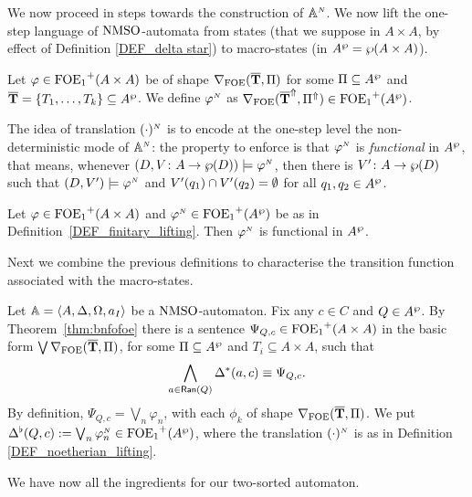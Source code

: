 We now proceed in steps towards the construction of $\mathbb{A}^{{\scriptscriptstyle N}}$. We now lift the one-step language of $\mathrm{NMSO}$-automata from states (that we suppose in $A \times A$, by effect of Definition \ref{DEF_delta star}) to macro-states (in $A^{\wp} = \wp (A \times A)$).

\begin{definition}\label{DEF_finitary_lifting}
Let $\varphi \in {\ensuremath{\mathrm{FOE}_1}}^+(A \times A)$ be of shape $\nabla_{\mathrm{FOE}}(\overline{{\mathbf{T}}},\Pi)$ for some $\Pi \subseteq A^{\wp}$ and $\overline{{\mathbf{T}}} = \{T_1,\dots,T_k\} \subseteq A^{\wp}$. We define $\varphi^{{\scriptscriptstyle N}}$ as $\nabla_{\mathrm{FOE}}(\overline{{\mathbf{T}}}^{\Uparrow},\Pi^{\Uparrow}) \in {\ensuremath{\mathrm{FOE}_1}}^+(A^{\wp} )$.
\end{definition}

The idea of translation $(\cdot)^{{\scriptscriptstyle N}}$ is to encode at the one-step level the non-deterministic mode of $\mathbb{A}^{{\scriptscriptstyle N}}$: the property to enforce is that $\varphi^{{\scriptscriptstyle N}}$ is \emph{functional} in $A^{\wp}$, that means, whenever $(D,V \colon A \to \wp(D)) \models \varphi^{{\scriptscriptstyle N}}$, then there is $V'  \colon A \to \wp(D)$ such that $(D, V') \models \varphi^{{\scriptscriptstyle N}}$ and  $ V'(q_1)\cap V'(q_2) = \emptyset$ for all $q_1,q_2 \in A^{\wp}$. 

\begin{lemma}\label{LEM_cont}
Let $\varphi \in {\ensuremath{\mathrm{FOE}_1}}^+(A \times A)$ and $\varphi^{{\scriptscriptstyle N}}\in {\ensuremath{\mathrm{FOE}_1}}^+(A^{\wp} )$ be as in Definition~\ref{DEF_finitary_lifting}. Then $\varphi^{{\scriptscriptstyle N}}$ is functional in $A^{\wp}$.
 \end{lemma}

 Next we combine the previous definitions to characterise the transition function associated with the macro-states.
\begin{definition}\label{PROP_DeltaPowerset}
Let $\mathbb{A} = \langle{A,\Delta,\Omega,a_I}\rangle$ be a $\mathrm{NMSO}$-automaton. Fix any $c \in C$ and $Q \in A^{\wp}$. By Theorem~\ref{thm:bnfofoe} there is a sentence $\Psi_{Q,c} \in {\ensuremath{\mathrm{FOE}_1}}^+(A\times A)$ in the basic form $\bigvee \nabla_{\mathrm{FOE}}(\overline{{\mathbf{T}}},\Pi)$, for some $\Pi \subseteq A^{\wp}$ and $T_i \subseteq A \times A$, such that
$$\bigwedge_{a \in \mathsf{Ran}(Q)} \Delta^{*}(a,c) \equiv \Psi_{Q,c}.$$
By definition, $\Psi_{Q,c} = \bigvee_{n}\varphi_n$, with each $\phi_{k}$ of shape $\nabla_{\mathrm{FOE}}(\overline{{\mathbf{T}}},\Pi)$.
%
We put $\Delta^{\flat}(Q,c) := \bigvee_{n}\varphi_n^{{\scriptscriptstyle N}}  \in {\ensuremath{\mathrm{FOE}_1}}^+(A^{\wp})$, where the translation $(\cdot)^{{\scriptscriptstyle N}}$ is as in Definition \ref{DEF_noetherian_lifting}.
\end{definition}

\noindent We have now all the ingredients for our two-sorted automaton.

